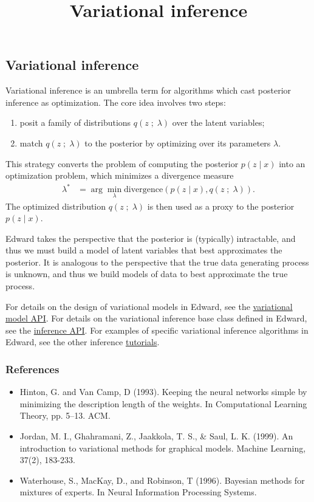 \title{Variational inference}

\subsection{Variational inference}

Variational inference is an umbrella term for algorithms which cast
posterior inference as optimization. The core idea involves two steps:
\begin{enumerate}
   \item posit a family of distributions $q(z\;;\;\lambda)$ over the
   latent variables;
   \item match $q(z\;;\;\lambda)$ to the posterior by optimizing over its
   parameters $\lambda$.
 \end{enumerate}
This strategy converts the problem of computing the posterior $p(z \mid x)$ into
an optimization problem, which minimizes a divergence measure
\begin{align*}
  \lambda^*
  &=
  \arg\min_\lambda \text{divergence}(
  p(z \mid x)
  ,
  q(z\;;\;\lambda)
  ).
\end{align*}
The optimized distribution $q(z\;;\;\lambda)$ is then used as a
proxy to the posterior $p(z\mid x)$.

Edward takes the perspective that the posterior is (typically)
intractable, and thus we must build a model of latent variables that
best approximates the posterior.
It is analogous to the perspective
that the true data generating process is unknown, and thus we build
models of data to best approximate the true process.

For details on the design of variational models in Edward, see the
\href{api/models_distributions.html}{variational model API}.
For details on the variational inference base class defined in Edward,
see the
\href{api/inferences.html}{inference API}.
For examples of specific variational inference algorithms in
Edward, see the other inference \href{tutorials.html}{tutorials}.

\subsubsection{References}\label{references}

\begin{itemize}
\item
  Hinton, G. and Van Camp, D (1993). Keeping the neural networks
  simple by minimizing the description length of the weights. In
  Computational Learning Theory, pp. 5–13. ACM.
\item
  Jordan, M. I., Ghahramani, Z., Jaakkola, T. S., & Saul, L. K.
  (1999). An introduction to variational methods for graphical models.
  Machine Learning, 37(2), 183-233.
\item
  Waterhouse, S., MacKay, D., and Robinson, T (1996). Bayesian methods
  for mixtures of experts. In Neural Information Processing Systems.
\end{itemize}
